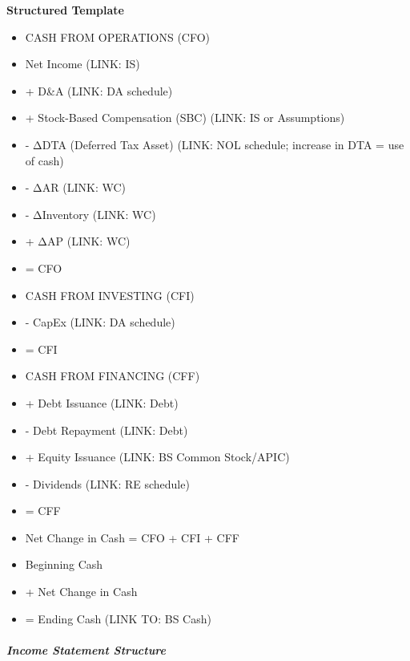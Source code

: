 \documentclass[11pt]{article}
\begin{document}
\textbf{Structured Template}
\begin{itemize}[leftmargin=*,itemsep=2pt,topsep=2pt]
\item {} CASH FROM OPERATIONS (CFO)
\item {} Net Income (LINK: IS)
\item {} + D\&A (LINK: DA schedule)
\item {} + Stock-Based Compensation (SBC) (LINK: IS or Assumptions)
\item {} - ΔDTA (Deferred Tax Asset) (LINK: NOL schedule; increase in DTA = use of cash)
\item {} - ΔAR (LINK: WC)
\item {} - ΔInventory (LINK: WC)
\item {} + ΔAP (LINK: WC)
\item {} = CFO
\item {} CASH FROM INVESTING (CFI)
\item {} - CapEx (LINK: DA schedule)
\item {} = CFI
\item {} CASH FROM FINANCING (CFF)
\item {} + Debt Issuance (LINK: Debt)
\item {} - Debt Repayment (LINK: Debt)
\item {} + Equity Issuance (LINK: BS Common Stock/APIC)
\item {} - Dividends (LINK: RE schedule)
\item {} = CFF
\item {} Net Change in Cash = CFO + CFI + CFF
\item {} Beginning Cash
\item {} + Net Change in Cash
\item {} = Ending Cash (LINK TO: BS Cash)
\end{itemize}

\subparagraph{Income Statement Structure}\mbox{}\par
\end{document}
